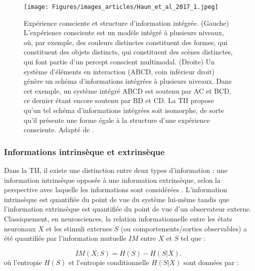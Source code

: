 \begin{figure*}[!t]
\center
\texttt{[image: Figures/images\_articles/Haun\_et\_al\_2017\_1.jpeg]}
\caption[Expérience consciente et structure d'information intégrée]{Expérience consciente et structure d'information intégrée. (Gauche) L'expérience consciente est un modèle intégré à plusieurs niveaux, où, par exemple, des couleurs distinctes constituent des formes, qui constituent des objets distincts, qui constituent des scènes distinctes, qui font partie d'un percept conscient multimodal. (Droite) Un système d'éléments en interaction (ABCD, coin inférieur droit) génère un schéma d'informations intégrées à plusieurs niveaux. Dans cet exemple, un système intégré ABCD est soutenu par AC et BCD, ce dernier étant encore soutenu par BD et CD. La TII propose qu'un tel schéma d'informations intégrées soit isomorphe, de sorte qu'il présente une forme égale à la structure d'une expérience consciente. Adapté de \cite{haun2017conscious}.}
\label{fig:figure2structureinformationintegree}
\end{figure*}

\subsubsection{Informations intrinsèque et extrinsèque}
\label{theorieinfointegreeinformation}

Dans la TII, il existe une distinction entre deux types d'information : une information intrinsèque opposée à une information extrinsèque, selon la perspective avec laquelle les informations sont considérées \citep{oizumi2014phenomenology}. 
L'information intrinsèque est quantifiée du point de vue du système lui-même tandis que l'information extrinsèque est quantifiée du point de vue d'un observateur externe. 
Classiquement, en neurosciences, la relation informationnelle entre les états neuronaux $X$ et les stimuli externes $S$ (ou comportements/sorties observables) a été quantifiée par l'information mutuelle $IM$ entre $X$ et $S$ \citep{rieke1999spikes, dayan2001theoretical, averbeck2006neural, quiroga2009extracting} tel que : 

\begin{equation}
IM(X; S) = H(S) - H(S|X).
\end{equation}
où l'entropie $H(S)$ et l'entropie conditionnelle $H(S|X)$ sont données par :

